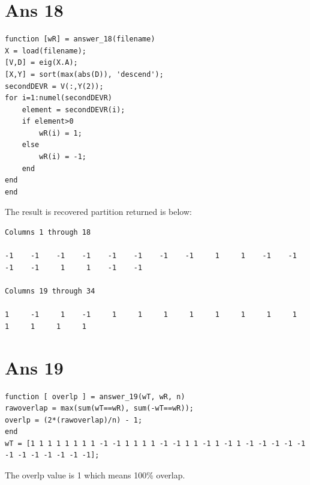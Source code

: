 \documentclass[10pt]{article}
\begin{document}
\section*{Ans 18}
\begin{flushleft}
\begin{lstlisting}
function [wR] = answer_18(filename)
X = load(filename);
[V,D] = eig(X.A);
[X,Y] = sort(max(abs(D)), 'descend');
secondDEVR = V(:,Y(2));
for i=1:numel(secondDEVR)
    element = secondDEVR(i);
    if element>0
        wR(i) = 1;
    else
        wR(i) = -1;
    end
end
end\end{lstlisting}
The result is recovered partition returned is below:\\
\begin{lstlisting}
Columns 1 through 18

-1    -1    -1    -1    -1    -1    -1    -1     1     1    -1    -1    -1    -1     1     1    -1    -1

Columns 19 through 34

1     -1     1    -1     1     1     1     1     1     1     1     1     1     1     1     1
\end{lstlisting}
\end{flushleft}
\section*{Ans 19}
\begin{flushleft}
\begin{lstlisting}
function [ overlp ] = answer_19(wT, wR, n)
rawoverlap = max(sum(wT==wR), sum(-wT==wR));
overlp = (2*(rawoverlap)/n) - 1;
end
wT = [1 1 1 1 1 1 1 1 -1 -1 1 1 1 1 -1 -1 1 1 -1 1 -1 1 -1 -1 -1 -1 -1 -1 -1 -1 -1 -1 -1 -1];
\end{lstlisting}
The overlp value is 1 which means 100\% overlap.
\end{flushleft}
\end{document}
